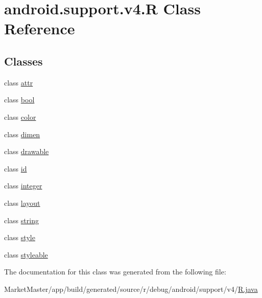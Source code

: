 \hypertarget{classandroid_1_1support_1_1v4_1_1R}{}\section{android.\+support.\+v4.\+R Class Reference}
\label{classandroid_1_1support_1_1v4_1_1R}
\subsection*{Classes}
\begin{DoxyCompactItemize}
\item 
class \mbox{\hyperlink{classandroid_1_1support_1_1v4_1_1R_1_1attr}{attr}}
\item 
class \mbox{\hyperlink{classandroid_1_1support_1_1v4_1_1R_1_1bool}{bool}}
\item 
class \mbox{\hyperlink{classandroid_1_1support_1_1v4_1_1R_1_1color}{color}}
\item 
class \mbox{\hyperlink{classandroid_1_1support_1_1v4_1_1R_1_1dimen}{dimen}}
\item 
class \mbox{\hyperlink{classandroid_1_1support_1_1v4_1_1R_1_1drawable}{drawable}}
\item 
class \mbox{\hyperlink{classandroid_1_1support_1_1v4_1_1R_1_1id}{id}}
\item 
class \mbox{\hyperlink{classandroid_1_1support_1_1v4_1_1R_1_1integer}{integer}}
\item 
class \mbox{\hyperlink{classandroid_1_1support_1_1v4_1_1R_1_1layout}{layout}}
\item 
class \mbox{\hyperlink{classandroid_1_1support_1_1v4_1_1R_1_1string}{string}}
\item 
class \mbox{\hyperlink{classandroid_1_1support_1_1v4_1_1R_1_1style}{style}}
\item 
class \mbox{\hyperlink{classandroid_1_1support_1_1v4_1_1R_1_1styleable}{styleable}}
\end{DoxyCompactItemize}


The documentation for this class was generated from the following file\+:\begin{DoxyCompactItemize}
\item 
Market\+Master/app/build/generated/source/r/debug/android/support/v4/\mbox{\hyperlink{debug_2android_2support_2v4_2R_8java}{R.\+java}}\end{DoxyCompactItemize}
